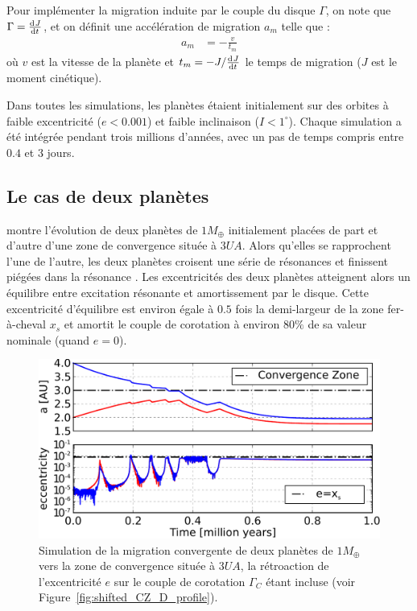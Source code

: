 Pour implémenter la migration induite par le couple du disque $\Gamma$, on note que $\Gamma=\od{J}{t}$, et on définit une accélération de migration $a_m$ telle que\citep[eq. (14)]{cresswell2008three} :
\begin{align}
a_m &= - \frac{v}{t_m}
\end{align}
où $v$ est la vitesse de la planète et $t_m=-J/\od{J}{t}$ le temps de migration ($J$ est le moment cinétique).

\bigskip

Dans toutes les simulations, les planètes étaient initialement sur des orbites à faible excentricité ($e<0.001$) et faible inclinaison ($I<1^\circ$). Chaque simulation a été intégrée pendant trois millions d'années, avec un pas de temps compris entre $0.4$ et $3$ jours.

\subsection{Le cas de deux planètes}
 montre l'évolution de deux planètes de $1\unit{M_\oplus}$ initialement placées de part et d'autre d'une zone de convergence située à $3\unit{UA}$. Alors qu'elles se rapprochent l'une de l'autre, les deux planètes croisent une série de résonances et finissent piégées dans la résonance . Les excentricités des deux planètes atteignent alors un équilibre entre excitation résonante et amortissement par le disque. Cette excentricité d'équilibre est environ égale à $0.5$ fois la demi-largeur de la zone fer-à-cheval $x_s$ et amortit le couple de corotation à environ $80\%$ de sa valeur nominale (quand $e=0$). 

\begin{figure}[htbp]
\centering
\includegraphics[width=\linewidth]{figure/shifted/corotation_damping_influence.pdf}
\caption[Effet de l'amortissement du couple de corotation dans un cas à deux planètes.]{Simulation de la migration convergente
de deux planètes de $1\unit{M_\oplus}$ vers la zone de convergence située à $3\unit{UA}$, la rétroaction de l'excentricité $e$
sur le couple de corotation $\Gamma_C$ étant incluse (voir Figure~\ref{fig:shifted_CZ_D_profile}).}
\label{fig:two-planets}
\end{figure}

